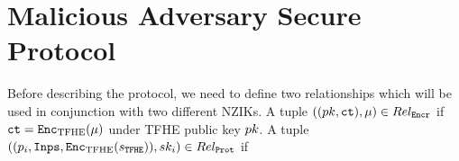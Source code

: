 \section{Malicious Adversary Secure Protocol}
\newcommand{\relEncr}{\proofRel_\texttt{Encr}}
\newcommand{\relProt}{\proofRel_\texttt{Prot}}
\newcommand{\proofEncr}[1]{\pi_{#1}^{\texttt{Encr}}}
\newcommand{\inCTList}{\texttt{Inps}}
\newcommand{\decryptShares}{\texttt{Shares}}
Before describing the protocol, we need to define two relationships which will be used in
conjunction with two different NZIKs. A tuple $((\TFHEPk, \ct), \mu) \in \relEncr$ if
$\texttt{ct} = \texttt{Enc}_{\mathrm{TFHE}}(\mu)$ under TFHE public key $pk$.
A tuple $((p_i, \inCTList, \Enc(s_\TFHE)), \TFHESk_i) \in \relProt$ if

\centering
